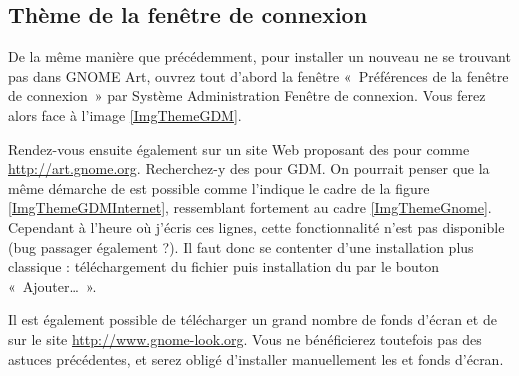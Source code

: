 \subsection{Thème de la fenêtre de connexion}
De la même manière que précédemment, pour installer un nouveau  ne se trouvant pas dans GNOME Art, ouvrez tout d'abord la fenêtre «~Préférences de la fenêtre de connexion~» par Système \FlecheDroite Administration \FlecheDroite Fenêtre de connexion. Vous ferez alors face à l'image \ref{ImgThemeGDM}.\par
{}
Rendez-vous ensuite également sur un site Web proposant des  pour  comme \url{http://art.gnome.org}. Recherchez-y des  pour GDM. On pourrait penser que la même démarche de  est possible comme l'indique le cadre de la figure \ref{ImgThemeGDMInternet}, ressemblant fortement au cadre \ref{ImgThemeGnome}.
Cependant à l'heure où j'écris ces lignes, cette fonctionnalité n'est pas disponible (bug passager également ?). Il faut donc se contenter d'une installation plus classique : téléchargement du fichier puis installation du  par le bouton «~Ajouter\ldots{}~».\par
{}
\begin{nota}
Il est également possible de télécharger un grand nombre de fonds d'écran et de  sur le site \url{http://www.gnome-look.org}. Vous ne bénéficierez toutefois pas des astuces précédentes, et serez obligé d'installer manuellement les  et fonds d'écran.
\end{nota}
